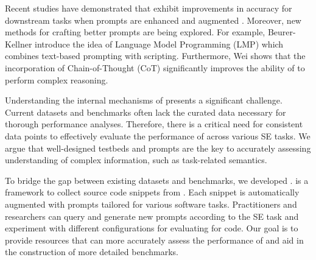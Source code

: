 Recent studies have demonstrated that \llms exhibit improvements in accuracy for downstream tasks when prompts are enhanced and augmented \cite{Zhou2022LargeLM, White2023ChatGPTPP}. Moreover, new methods for crafting better prompts are being explored. For example, Beurer-Kellner \etal \cite{promptingIsProgramming} introduce the idea of Language Model Programming (LMP) which combines text-based prompting with scripting. Furthermore, Wei \etal \cite{wei_chain--thought_2023} shows that the incorporation of Chain-of-Thought (CoT) significantly improves the ability of \llms to perform complex reasoning.



Understanding the internal mechanisms of \llms presents a significant challenge. Current datasets and benchmarks often lack the curated data necessary for thorough performance analyses. Therefore, there is a critical need for consistent data points to effectively evaluate the performance of \llms across various SE tasks. We argue that well-designed testbeds and prompts are the key to accurately assessing \llms understanding of complex information, such as task-related semantics.


To bridge the gap between existing datasets and benchmarks, we developed \snipgen. \snipgen is a framework to collect source code snippets from \github. Each snippet is automatically augmented with prompts tailored for various software tasks. Practitioners and researchers can query and generate new prompts according to the SE task and experiment with different configurations for evaluating \llms for code.  Our goal is to provide resources that can more accurately assess the performance of \llms and aid in the construction of more detailed benchmarks.

